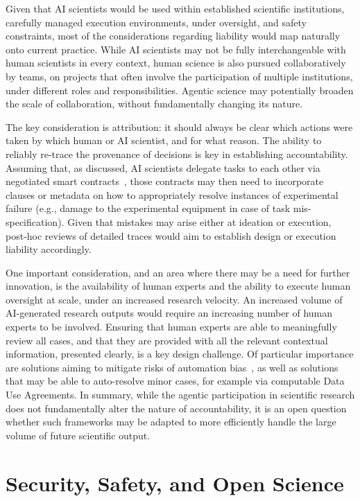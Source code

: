 \documentclass[11pt, a4paper, twocolumn, goog]{google}
\begin{document}
Given that AI scientists would be used within established scientific institutions, carefully managed execution environments, under oversight, and safety constraints, most of the considerations regarding liability would map naturally onto current practice. While AI scientists may not be fully interchangeable with human scientists in every context, human science is also pursued collaboratively by teams, on projects that often involve the participation of multiple institutions, under different roles and responsibilities. Agentic science may potentially broaden the scale of collaboration, without fundamentally changing its nature.

The key consideration is attribution: it should always be clear which actions were taken by which human or AI scientist, and for what reason. The ability to reliably re-trace the provenance of decisions is key in establishing accountability. Assuming that, as discussed, AI scientists delegate tasks to each other via negotiated smart contracts~\citep{filippi2021smart}, those contracts may then need to incorporate clauses or metadata on how to appropriately resolve instances of experimental failure (e.g., damage to the experimental equipment in case of task mis-specification). Given that mistakes may arise either at ideation or execution, post-hoc reviews of detailed traces would aim to establish design or execution liability accordingly.

One important consideration, and an area where there may be a need for further innovation, is the availability of human experts and the ability to execute human oversight at scale, under an increased research velocity. An increased volume of AI-generated research outputs would require an increasing number of human experts to be involved. Ensuring that human experts are able to meaningfully review all cases, and that they are provided with all the relevant contextual information, presented clearly, is a key design challenge. Of particular importance are solutions aiming to mitigate risks of automation bias~\citep{cummings2017automation}, as well as solutions that may be able to auto-resolve minor cases, for example via computable Data Use Agreements. In summary, while the agentic participation in scientific research does not fundamentally alter the nature of accountability, it is an open question whether such frameworks may be adapted to more efficiently handle the large volume of future scientific output. 

\section{Security, Safety, and Open Science}
\label{sec:infosecurity}
\end{document}
